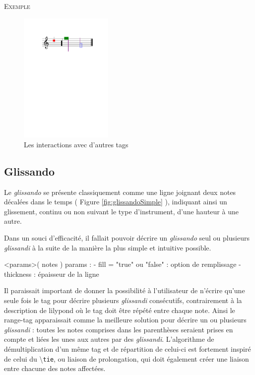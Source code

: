 \documentclass{article}
\newenvironment{gmncode}	{\vspace{-2mm}\small\verbatim}{\endverbatim\vspace{-2mm}}
\newcommand{\code}[1]		{{\small \texttt{#1}}}
\newcommand{\guidotag}[1]	{\textbackslash\code{#1}}
\newcommand{\exemple}		{\vspace{2mm}\hspace*{-6mm}\textsc{Exemple}}
\begin{document}
\exemple
\begin{figure}[h]
\centering
\begin{gmncode}
[
  \cluster<color="red", hdx=1, hdy=3>({a})
  \cluster<size=0.5>({f,c2})
  \noteFormat<color="purple">
  \headsReverse
  \cluster<color="green", size=2>({f, g2})
  \cluster<"blue">({d1/2, g})
]
\end{gmncode}
\includegraphics[width=45mm]{img/partitions/clusterInteractions.pdf}
\caption{Les interactions avec d'autres tags}
\label{fig:clusterInteractions}
\end{figure}
%


\subsection{Glissando}\label{subsec:glissando}

Le \emph{glissando} se présente classiquement comme une ligne joignant deux notes décalées dans le temps ( Figure \ref{fig:glissandoSimple} ), indiquant ainsi un glissement, continu ou non suivant le type d'instrument, d'une hauteur à une autre.

Dans un souci d'efficacité, il fallait pouvoir décrire un \emph{glissando} seul ou plusieurs \emph{glissandi} à la suite de la manière la plus simple et intuitive possible. 

\begin{gmncode}
  \glissando<params>( notes )
  params : 
    - fill = "true" ou "false" : 
      option de remplissage
    - thickness : épaisseur de la ligne
\end{gmncode}

Il paraissait important de donner la possibilité à l'utilisateur de n'écrire qu'une seule fois le tag pour décrire plusieurs \emph{glissandi} consécutifs, contrairement à la description de lilypond où le tag doit être répété entre chaque note. Ainsi le range-tag apparaissait comme la meilleure solution pour décrire un ou plusieurs \emph{glissandi} : toutes les notes comprises dans les parenthèses seraient prises en compte et liées les unes aux autres par des \emph{glissandi}. L'algorithme de démultiplication d'un même tag et de répartition de celui-ci est fortement inspiré de celui du \guidotag{tie}, ou liaison de prolongation, qui doit également créer une liaison entre chacune des notes affectées.
\end{document}

